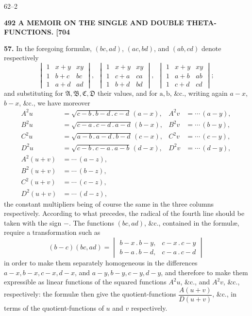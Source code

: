 \documentclass[11pt]{article}
\newcommand{\Ag}{\mathfrak{A}}
\newcommand{\Bg}{\mathfrak{B}}
\newcommand{\Cg}{\mathfrak{C}}
\newcommand{\Dg}{\mathfrak{D}}
\begin{document}
\hfill 62--2

\bigskip
\noindent\textbf{492 \hfill A MEMOIR ON THE SINGLE AND DOUBLE THETA-FUNCTIONS. \hfill [704}

\medskip
\textbf{57.} In the foregoing formul\ae, $(bc,ad)$, $(ac,bd)$, and $(ab,cd)$ denote respectively
\[
\begin{vmatrix} 1 & x+y & xy\\ 1 & b+c & bc\\ 1 & a+d & ad \end{vmatrix},\ \
\begin{vmatrix} 1 & x+y & xy\\ 1 & c+a & ca\\ 1 & b+d & bd \end{vmatrix},\ \
\begin{vmatrix} 1 & x+y & xy\\ 1 & a+b & ab\\ 1 & c+d & cd \end{vmatrix};
\]
and substituting for $\Ag,\Bg,\Cg,\Dg$ their values, and for $\mathrm{a},\mathrm{b}$, \&c., writing again $a-x$, $b-x$, \&c., we have moreover
\[
\begin{aligned}
A^2 u &= \sqrt{c-b\,.\,b-d\,.\,c-d}\,(a-x), & A^2 v &= \cdots\,(a-y),\\
B^2 u &= \sqrt{c-a\,.\,c-d\,.\,a-d}\,(b-x), & B^2 v &= \cdots\,(b-y),\\
C^2 u &= \sqrt{a-b\,.\,a-d\,.\,b-d}\,(c-x), & C^2 v &= \cdots\,(c-y),\\
D^2 u &= \sqrt{c-b\,.\,c-a\,.\,a-b}\,(d-x), & D^2 v &= \cdots\,(d-y),\\
A^2(u+v) &= \cdots\,(a-z),\\
B^2(u+v) &= \cdots\,(b-z),\\
C^2(u+v) &= \cdots\,(c-z),\\
D^2(u+v) &= \cdots\,(d-z),
\end{aligned}
\]
the constant multipliers being of course the same in the three columns respectively. According to what precedes, the radical of the fourth line should be taken with the sign $-$. The functions $(bc,ad)$, \&c., contained in the formul\ae, require a transformation such as
\[
(b-c)(bc,ad) = \begin{vmatrix} b-x\,.\,b-y, & c-x\,.\,c-y\\ b-a\,.\,b-d, & c-a\,.\,c-d \end{vmatrix}
\]
in order to make them separately homogeneous in the differences $a-x,b-x,c-x,d-x$, and $a-y,b-y,c-y,d-y$, and therefore to make them expressible as linear functions of the squared functions $A^2 u$, \&c., and $A^2 v$, \&c., respectively: the formul\ae{} then give the quotient-functions $\dfrac{A(u+v)}{D(u+v)}$, \&c., in terms of the quotient-functions of $u$ and $v$ respectively.
\end{document}
